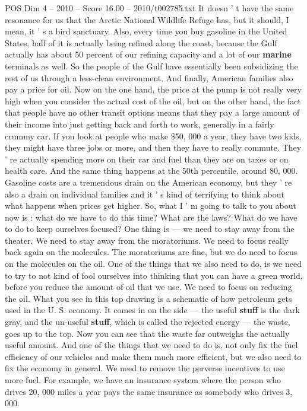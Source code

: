 \begin{textsample}{POS Dim 4 – 2010 – Score 16.00 – 2010/t002785.txt}
It doesn ' t have the same resonance for us that the Arctic National Wildlife Refuge has, but it should, I mean, it ' s a bird sanctuary.
Also, every time you buy gasoline in the United States, half of it is actually being refined along the coast, because the Gulf actually has about 50 percent of our refining capacity and a lot of our \textbf{marine} terminals as well.
So the people of the Gulf have essentially been subsidizing the rest of us through a less-clean environment.
And finally, American families also pay a price for oil.
Now on the one hand, the price at the pump is not really very high when you consider the actual cost of the oil, but on the other hand, the fact that people have no other transit options means that they pay a large amount of their income into just getting back and forth to work, generally in a fairly crummy car.
If you look at people who make \$50, 000 a year, they have two kids, they might have three jobs or more, and then they have to really commute.
They ' re actually spending more on their car and fuel than they are on taxes or on health care.
And the same thing happens at the 50th percentile, around 80, 000.
Gasoline costs are a tremendous drain on the American economy, but they ' re also a drain on individual families and it ' s kind of terrifying to think about what happens when prices get higher.
So, what I ' m going to talk to you about now is : what do we have to do this time?
What are the laws?
What do we have to do to keep ourselves focused?
One thing is — we need to stay away from the theater.
We need to stay away from the moratoriums.
We need to focus really back again on the molecules.
The moratoriums are fine, but we do need to focus on the molecules on the oil.
One of the things that we also need to do, is we need to try to not kind of fool ourselves into thinking that you can have a green world, before you reduce the amount of oil that we use.
We need to focus on reducing the oil.
What you see in this top drawing is a schematic of how petroleum gets used in the U.
S. economy.
It comes in on the side — the useful \textbf{stuff} is the dark gray, and the un-useful \textbf{stuff}, which is called the rejected energy — the waste, goes up to the top.
Now you can see that the waste far outweighs the actually useful amount.
And one of the things that we need to do is, not only fix the fuel efficiency of our vehicles and make them much more efficient, but we also need to fix the economy in general.
We need to remove the perverse incentives to use more fuel.
For example, we have an insurance system where the person who drives 20, 000 miles a year pays the same insurance as somebody who drives 3, 000.

\end{textsample}
